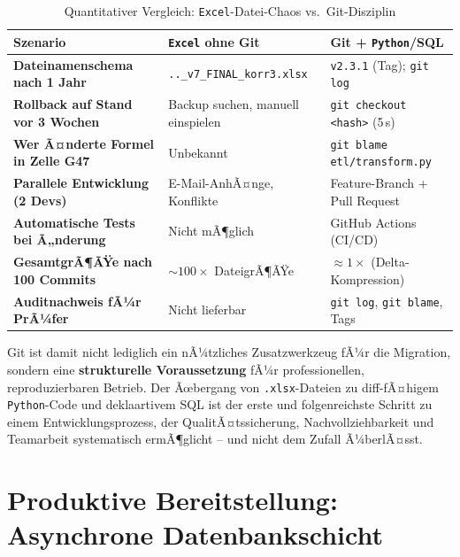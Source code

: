 ﻿\documentclass[12pt,a4paper]{report}
\theoremstyle{definition}
\theoremstyle{remark}
\newcommand{\excel}{\texttt{Excel}}
\newcommand{\py}{\texttt{Python}}
\newcommand{\code}[1]{\texttt{#1}}
\begin{document}
\begin{table}[H]
\centering
\caption{Quantitativer Vergleich: \excel-Datei-Chaos vs.\ Git-Disziplin}
\label{tab:git-quantitativ}
\renewcommand{\arraystretch}{1.4}
\begin{tabularx}{\linewidth}{>{\footnotesize\bfseries}l
                              >{\footnotesize}X
                              >{\footnotesize}X}
\toprule
Szenario                        & \excel{} ohne Git              & Git + \py{}/SQL \\
\midrule
Dateinamenschema nach 1 Jahr    & \code{..\_v7\_FINAL\_korr3.xlsx} & \code{v2.3.1} (Tag); \code{git log} \\
Rollback auf Stand vor 3 Wochen & Backup suchen, manuell einspielen & \code{git checkout <hash>} (5\,s) \\
Wer Ã¤nderte Formel in Zelle G47 & Unbekannt                       & \code{git blame etl/transform.py} \\
Parallele Entwicklung (2 Devs)  & E-Mail-AnhÃ¤nge, Konflikte       & Feature-Branch + Pull Request \\
Automatische Tests bei Ã„nderung & Nicht mÃ¶glich                   & GitHub Actions (CI/CD) \\
GesamtgrÃ¶ÃŸe nach 100 Commits    & $\sim100\times$ DateigrÃ¶ÃŸe      & $\approx 1\times$ (Delta-Kompression) \\
Auditnachweis fÃ¼r PrÃ¼fer        & Nicht lieferbar                 & \code{git log}, \code{git blame}, Tags \\
\bottomrule
\end{tabularx}
\end{table}

Git ist damit nicht lediglich ein nÃ¼tzliches Zusatzwerkzeug fÃ¼r die
Migration, sondern eine \textbf{strukturelle Voraussetzung} fÃ¼r
professionellen, reproduzierbaren Betrieb.
Der Ãœbergang von \code{.xlsx}-Dateien zu diff-fÃ¤higem \py-Code und
deklaartivem SQL ist der erste und folgenreichste Schritt zu einem
Entwicklungsprozess, der QualitÃ¤tssicherung, Nachvollziehbarkeit
und Teamarbeit systematisch ermÃ¶glicht -- und nicht dem Zufall
Ã¼berlÃ¤sst.

\newpage
\chapter{Produktive Bereitstellung: Asynchrone Datenbankschicht}
\label{sec:prod}
\end{document}
